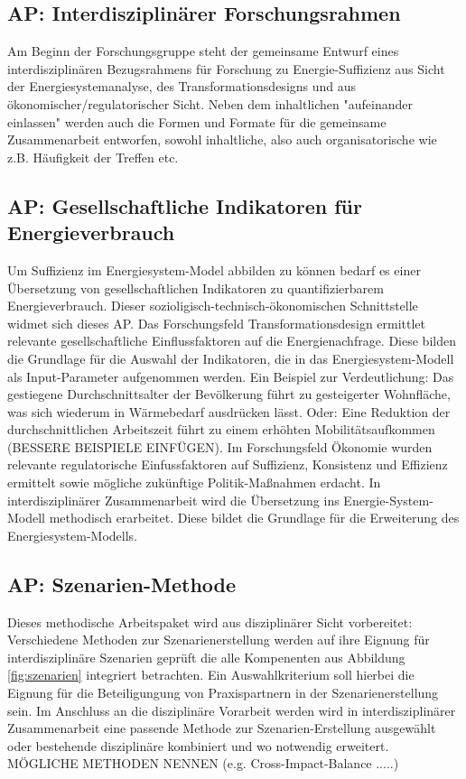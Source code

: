 \documentclass[a4paper,11pt,twoside]{scrartcl}
\begin{document}
\subsection*{AP: Interdisziplinärer Forschungsrahmen}
Am Beginn der Forschungsgruppe steht der gemeinsame Entwurf eines interdisziplinären Bezugsrahmens für Forschung zu Energie-Suffizienz aus Sicht der Energiesystemanalyse, des Transformationsdesigns und aus ökonomischer/regulatorischer Sicht. Neben dem inhaltlichen "aufeinander einlassen" werden auch die Formen und Formate für die gemeinsame Zusammenarbeit entworfen, sowohl inhaltliche, also auch organisatorische wie z.B. Häufigkeit der Treffen etc.

\subsection*{AP: Gesellschaftliche Indikatoren für Energieverbrauch}
Um Suffizienz im Energiesystem-Model abbilden zu können bedarf es einer Übersetzung von gesellschaftlichen Indikatoren zu quantifizierbarem Energieverbrauch. Dieser sozioligisch-technisch-ökonomischen Schnittstelle widmet sich dieses AP. Das Forschungsfeld Transformationsdesign ermittlet relevante gesellschaftliche Einflussfaktoren auf die Energienachfrage. Diese bilden die Grundlage für die Auswahl der Indikatoren, die in das Energiesystem-Modell als Input-Parameter aufgenommen werden. Ein Beispiel zur Verdeutlichung: Das gestiegene Durchschnittsalter der Bevölkerung führt zu gesteigerter Wohnfläche, was sich wiederum in Wärmebedarf ausdrücken lässt. Oder: Eine Reduktion der durchschnittlichen Arbeitszeit führt zu einem erhöhten Mobilitätsaufkommen (BESSERE BEISPIELE EINFÜGEN). Im Forschungsfeld Ökonomie wurden relevante regulatorische Einfussfaktoren auf Suffizienz, Konsistenz und Effizienz ermittelt sowie mögliche zukünftige Politik-Maßnahmen erdacht. In interdisziplinärer Zusammenarbeit wird die Übersetzung ins Energie-System-Modell methodisch erarbeitet. Diese bildet die Grundlage für die Erweiterung des Energiesystem-Modells.

\subsection*{AP: Szenarien-Methode}
Dieses methodische Arbeitspaket wird aus disziplinärer Sicht vorbereitet: Verschiedene Methoden zur Szenarienerstellung werden auf ihre Eignung für interdisziplinäre Szenarien geprüft die alle Kompenenten aus Abbildung \ref{fig:szenarien} integriert betrachten. Ein Auswahlkriterium soll hierbei die Eignung für die Beteiligungung von Praxispartnern in der Szenarienerstellung sein. Im Anschluss an die disziplinäre Vorarbeit werden wird in interdisziplinärer Zusammenarbeit eine passende Methode zur Szenarien-Erstellung ausgewählt oder bestehende disziplinäre kombiniert und wo notwendig erweitert. MÖGLICHE METHODEN NENNEN (e.g. Cross-Impact-Balance .....)
\end{document}
